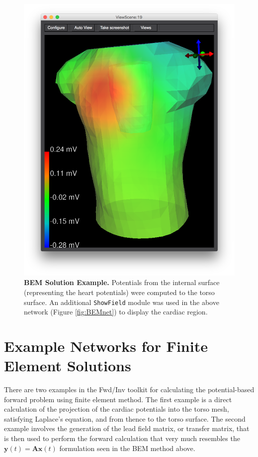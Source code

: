 \begin{figure}[H]
\begin{center}
\includegraphics[width=.9\textwidth]{ECGToolkitGuide_figures/BEMSolution.png}
\caption{{\bf BEM Solution Example.} Potentials from the internal surface (representing the heart potentials) were computed to the torso surface. An additional {\tt ShowField} module was used in the above network (Figure \ref{fig:BEMnet}) to display the cardiac region.}
\label{fig:BEMsol}
\end{center}
\vspace{-.25in}
\end{figure}

\newpage

\section{Example Networks for Finite Element Solutions}

There are two examples in the Fwd/Inv toolkit for calculating the potential-based forward problem using finite element method. The first example is a direct calculation of the projection of the cardiac potentials into the torso mesh, satisfying Laplace's equation, and from thence to the torso surface. 
The second example involves the generation of the lead field matrix, or transfer matrix, that is then used  to perform the forward calculation that very much resembles the $\mathbf{y}(t) = \mathbf{A}\mathbf{x}(t)$ formulation seen in the BEM method above.

